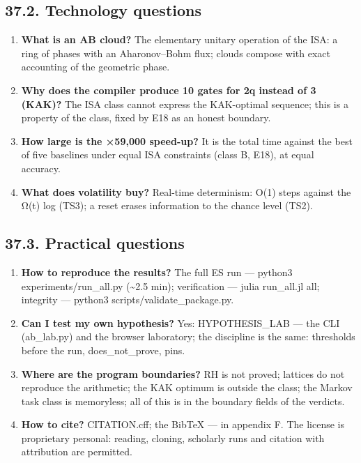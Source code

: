 \documentclass[11pt,a4paper]{article}
\begin{document}
\subsection{37.2. Technology questions}

\begin{enumerate}
  \item \textbf{What is an AB cloud?} The elementary unitary operation of the ISA: a ring of phases with an Aharonov–Bohm flux; clouds compose with exact accounting of the geometric phase.
  \item \textbf{Why does the compiler produce 10 gates for 2q instead of 3 (KAK)?} The ISA class cannot express the KAK-optimal sequence; this is a property of the class, fixed by E18 as an honest boundary.
  \item \textbf{How large is the ×59,000 speed-up?} It is the total time against the best of five baselines under equal ISA constraints (class B, E18), at equal accuracy.
  \item \textbf{What does volatility buy?} Real-time determinism: O(1) steps against the Ω(t) log (TS3); a reset erases information to the chance level (TS2).
\end{enumerate}

\subsection{37.3. Practical questions}

\begin{enumerate}
  \item \textbf{How to reproduce the results?} The full ES run — python3 experiments/run\_all.py (\textasciitilde{}2.5 min); verification — julia run\_all.jl all; integrity — python3 scripts/validate\_package.py.
  \item \textbf{Can I test my own hypothesis?} Yes: HYPOTHESIS\_LAB — the CLI (ab\_lab.py) and the browser laboratory; the discipline is the same: thresholds before the run, does\_not\_prove, pins.
  \item \textbf{Where are the program boundaries?} RH is not proved; lattices do not reproduce the arithmetic; the KAK optimum is outside the class; the Markov task class is memoryless; all of this is in the boundary fields of the verdicts.
  \item \textbf{How to cite?} CITATION.cff; the BibTeX — in appendix F. The license is proprietary personal: reading, cloning, scholarly runs and citation with attribution are permitted.
\end{enumerate}
\end{document}
